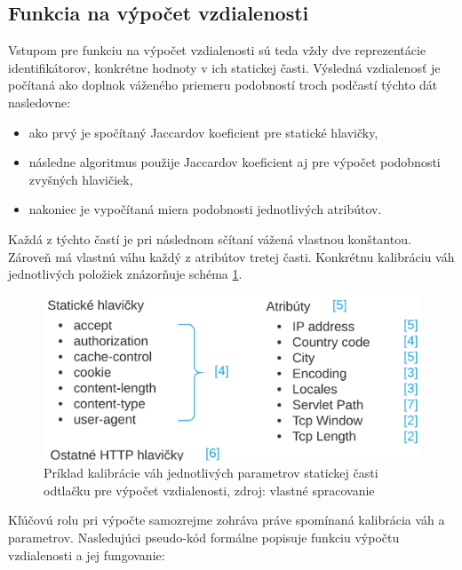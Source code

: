 \documentclass[
  digital, %
  oneside, %
  table,   %
  lof,     %
  nolot,   %
  nocover
]{fithesis3}
\begin{document}
\subsection{Funkcia na výpočet vzdialenosti}
\label{ss:distance-function}
Vstupom pre funkciu na výpočet vzdialenosti sú teda vždy dve reprezentácie
identifikátorov, konkrétne hodnoty v ich statickej časti. Výsledná vzdialenosť
je počítaná ako doplnok váženého priemeru podobností troch podčastí týchto dát
nasledovne:

\begin{itemize}
	\item ako prvý je spočítaný Jaccardov koeficient pre statické hlavičky,
	\item následne algoritmus použije Jaccardov koeficient aj pre výpočet podobnosti
	zvyšných hlavičiek,
	\item nakoniec je vypočítaná miera podobnosti jednotlivých atribútov. 
\end{itemize}

\noindent Každá z týchto častí je pri následnom sčítaní vážená vlastnou konštantou.
Zároveň má vlastnú váhu každý z atribútov tretej časti. Konkrétnu kalibráciu
váh jednotlivých položiek znázorňuje schéma \ref{fig:footprint-distance-cal}.

\begin{figure}[H]
  \centering
    \includegraphics[width=.90\textwidth]{images/footprint-distance-cal.png}
  \caption{Príklad kalibrácie váh jednotlivých parametrov statickej časti
  odtlačku pre výpočet vzdialenosti, zdroj: vlastné spracovanie}
  \label{fig:footprint-distance-cal}
\end{figure}

Kľúčovú rolu pri výpočte samozrejme zohráva práve spomínaná kalibrácia váh a parametrov.
Nasledujúci pseudo-kód formálne popisuje funkciu výpočtu vzdialenosti a jej fungovanie:
\end{document}
